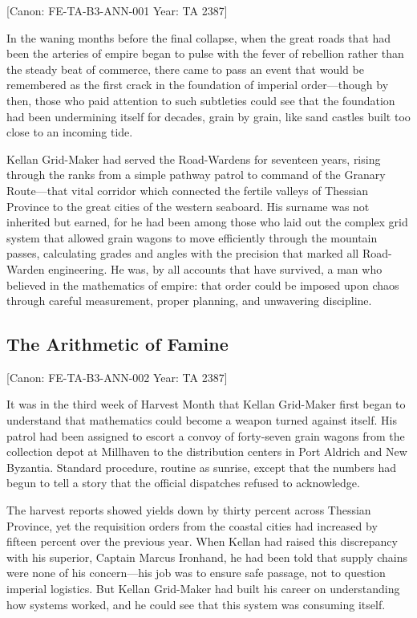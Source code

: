 {[}Canon: FE-TA-B3-ANN-001 \textbar{} Year: TA 2387{]}

In the waning months before the final collapse, when the great roads
that had been the arteries of empire began to pulse with the fever of
rebellion rather than the steady beat of commerce, there came to pass an
event that would be remembered as the first crack in the foundation of
imperial order---though by then, those who paid attention to such
subtleties could see that the foundation had been undermining itself for
decades, grain by grain, like sand castles built too close to an
incoming tide.

Kellan Grid-Maker had served the Road-Wardens for seventeen years,
rising through the ranks from a simple pathway patrol to command of the
Granary Route---that vital corridor which connected the fertile valleys
of Thessian Province to the great cities of the western seaboard. His
surname was not inherited but earned, for he had been among those who
laid out the complex grid system that allowed grain wagons to move
efficiently through the mountain passes, calculating grades and angles
with the precision that marked all Road-Warden engineering. He was, by
all accounts that have survived, a man who believed in the mathematics
of empire: that order could be imposed upon chaos through careful
measurement, proper planning, and unwavering discipline.

\subsection{The Arithmetic of Famine}\label{the-arithmetic-of-famine}

{[}Canon: FE-TA-B3-ANN-002 \textbar{} Year: TA 2387{]}

It was in the third week of Harvest Month that Kellan Grid-Maker first
began to understand that mathematics could become a weapon turned
against itself. His patrol had been assigned to escort a convoy of
forty-seven grain wagons from the collection depot at Millhaven to the
distribution centers in Port Aldrich and New Byzantia. Standard
procedure, routine as sunrise, except that the numbers had begun to tell
a story that the official dispatches refused to acknowledge.

The harvest reports showed yields down by thirty percent across Thessian
Province, yet the requisition orders from the coastal cities had
increased by fifteen percent over the previous year. When Kellan had
raised this discrepancy with his superior, Captain Marcus Ironhand, he
had been told that supply chains were none of his concern---his job was
to ensure safe passage, not to question imperial logistics. But Kellan
Grid-Maker had built his career on understanding how systems worked, and
he could see that this system was consuming itself.

